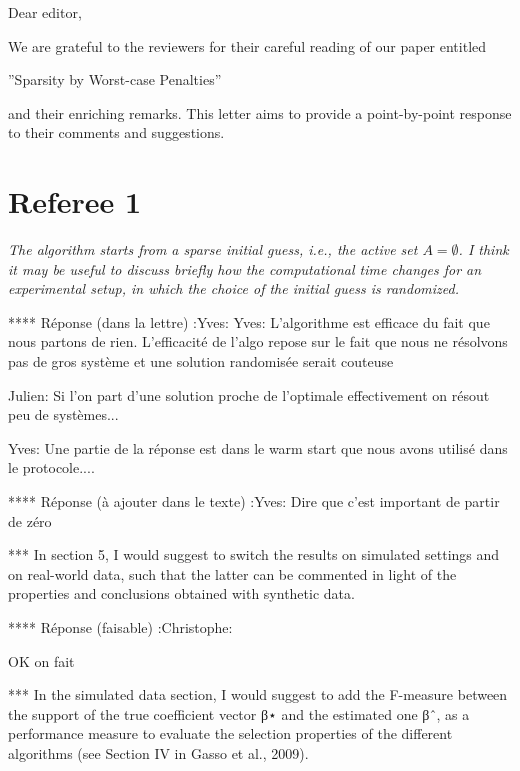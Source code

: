 \documentclass[a4paper,11pt]{texMemo}
\begin{document}
\maketitle
Dear editor,

We are grateful to the reviewers for their careful reading  of
our paper entitled

\begin{center}
  ''Sparsity by Worst-case Penalties''
\end{center}

and their enriching remarks. This letter aims to provide a
point-by-point response to their comments and suggestions.

\section*{Referee 1}



\emph{The algorithm starts from a sparse initial guess, i.e., the active
set $A = \emptyset$.  I think it may be useful to discuss briefly how the
computational time changes for an experimental setup, in which the
choice of the initial guess is randomized.}





****  Réponse (dans la lettre) :Yves:
Yves: 
L'algorithme est efficace du fait que nous partons de rien.
L'efficacité de l'algo repose sur le fait que nous ne résolvons pas de gros système et une solution randomisée serait couteuse

Julien:
Si l'on part d'une solution proche de l'optimale effectivement on résout peu de systèmes... 

Yves: 
Une partie de la réponse est dans le warm start que nous avons utilisé dans le protocole....

**** Réponse (à ajouter dans le texte) :Yves:
Dire que c'est important de partir de zéro 

*** In section 5,
I would suggest to switch the results on simulated settings and on real-world
data, such that the latter can be commented in light of the properties and
conclusions obtained with synthetic data.

**** Réponse (faisable) :Christophe:

OK on fait 

*** In the simulated data section, 
I would suggest to add the F-measure between the support of the true coefficient
vector β⋆ and the estimated one βˆ, as a performance measure to evaluate the
selection properties of the different algorithms (see Section IV in Gasso et
al., 2009).
\end{document}
